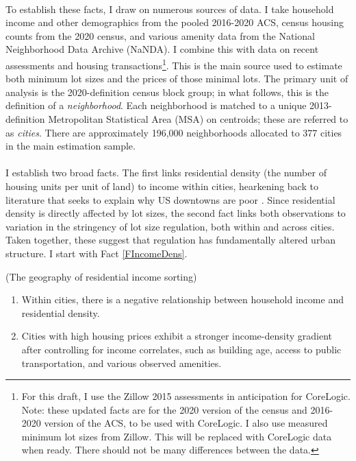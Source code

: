 \documentclass[]{article}
\begin{document}
	\paragraph*{}
	 To establish these facts, I draw on numerous sources of data. I take household income and other demographics from the pooled 2016-2020 ACS, census housing counts from the 2020 census, and various amenity data from the National Neighborhood Data Archive (NaNDA). I combine this with data on recent assessments and housing transactions\footnote{For this draft, I use the Zillow 2015 assessments in anticipation for CoreLogic. Note: these updated facts are for the 2020 version of the census and 2016-2020 version of the ACS, to be used with CoreLogic. I also use measured minimum lot sizes from Zillow. This will be replaced with CoreLogic data when ready. There should not be many differences between the data. }. This is the main source used to estimate both minimum lot sizes and the prices of those minimal lots. The primary unit of analysis is the 2020-definition census block group; in what follows, this is the definition of a \textit{neighborhood}. Each neighborhood is matched to a unique 2013-definition Metropolitan Statistical Area (MSA) on centroids; these are referred to as \textit{cities}. There are approximately 196,000 neighborhoods allocated to 377 cities in the main estimation sample.   
	
	\paragraph*{}
	I establish two broad facts. The first links residential density (the number of housing units per unit of land) to income within cities, hearkening back to literature that seeks to explain why US downtowns are poor \citep{Gentrificationcycles, ccpoortransport, parispoor}. Since residential density is directly affected by lot sizes, the second fact links both observations to variation in the stringency of lot size regulation, both within and across cities. Taken together, these suggest that regulation has fundamentally altered urban structure. I start with Fact \ref{FIncomeDens}. 

\begin{Fact}\label{FIncomeDens}
	(The geography of residential income sorting)
	\begin{enumerate}
		\item Within cities, there is a negative relationship between household income and residential density. 
		
		\item Cities with high housing prices exhibit a stronger income-density gradient after controlling for income correlates, such as building age, access to public transportation, and various observed amenities.
	\end{enumerate}
\end{Fact}
\end{document}

